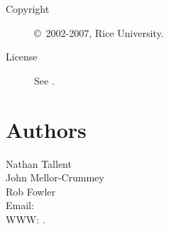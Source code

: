 \documentclass[english]{article}
\begin{document}
\begin{description}
\item[Copyright] \copyright\ 2002-2007, Rice University.
\item[License] See .
\end{description}

\section{Authors}

\noindent
Nathan Tallent \\
John Mellor-Crummey \\
Rob Fowler \\
Email:  \\
WWW: .

\LatexManEnd
\end{document}
